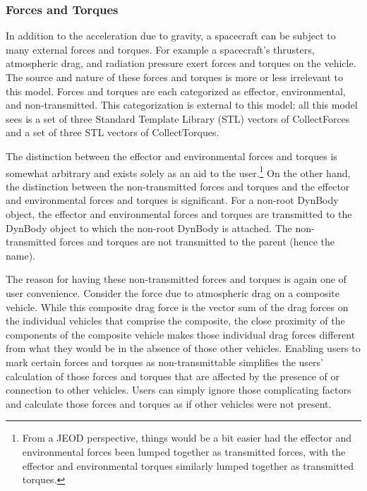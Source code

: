 \subsubsection{Forces and Torques}
In addition to the acceleration due to gravity,
a spacecraft can be subject to many external forces and torques.
For example a spacecraft's thrusters, atmospheric drag, and radiation pressure
exert forces and torques on the vehicle. The source and nature of these forces
and torques is more or less irrelevant to this model.
Forces and torques are each categorized as effector, environmental, and
non-transmitted. This categorization is external to this model; all this model
sees is a set of three Standard Template Library (STL) vectors of
CollectForces and a set of three STL vectors of CollectTorques.

The distinction between the effector and environmental forces and torques is
somewhat arbitrary and exists solely as an aid to the user.\footnote{From a
JEOD perspective, things would be a bit easier had the effector and
environmental  forces been lumped together as transmitted forces, with the
effector and environmental torques similarly lumped together as transmitted
torques.}
On the other hand, the distinction between the non-transmitted forces and
torques and the effector and environmental forces and torques is significant.
For a non-root DynBody object, the effector and environmental forces and
torques are transmitted to the DynBody object to which the non-root DynBody is
attached. The non-transmitted forces and torques are not transmitted to the
parent (hence the name).

The reason for having these non-transmitted forces and torques is again one of
user convenience. Consider the force due to atmospheric drag on a composite
vehicle. While this composite drag force is the vector sum of the drag forces
on the individual vehicles that comprise the composite, the close proximity of
the components of the composite vehicle makes those individual drag forces
different from what they would be in the absence of those other vehicles.
Enabling users to mark certain forces and torques as non-transmittable
simplifies the users' calculation of those forces and torques that are affected
by the presence of or connection to other vehicles. Users can simply ignore
those complicating factors and calculate those forces and torques as if other
vehicles were not present.

